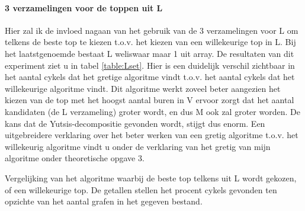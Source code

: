 \documentclass[11pt, a4paper, table]{article}
\theoremstyle{definition}
\theoremstyle{definition}
\theoremstyle{definition}
\begin{document}
\paragraph{3 verzamelingen voor de toppen uit L}
Hier zal ik de invloed nagaan van het gebruik van de 3 verzamelingen voor L om telkens de beste top te kiezen t.o.v. het kiezen van een willekeurige top in L. Bij het laatstgenoemde bestaat L weliswaar maar 1 uit array. De resultaten van dit experiment ziet u in tabel \ref{table:Lset}. Hier is een duidelijk verschil zichtbaar in het aantal cykels dat het gretige algoritme vindt t.o.v. het aantal cykels dat het willekeurige algoritme vindt. Dit algoritme werkt zoveel beter aangezien het kiezen van de top met het hoogst aantal buren in V ervoor zorgt dat het aantal kandidaten (de L verzameling) groter wordt, en dus M ook zal groter worden. De kans dat de Yutsis-decompositie gevonden wordt, stijgt dus enorm. Een uitgebreidere verklaring over het beter werken van een gretig algoritme t.o.v. het willekeurig algoritme vindt u onder de verklaring van het gretig van mijn algoritme onder theoretische opgave 3. 
\begin{table}[bh]
	\center
	\caption{Vergelijking van het algoritme waarbij de beste top telkens uit L wordt gekozen, of een willekeurige top. De getallen stellen het procent cykels gevonden ten opzichte van het aantal grafen in het gegeven bestand.
		\label{table:Lset}
	} 
\end{table}
\end{document}

